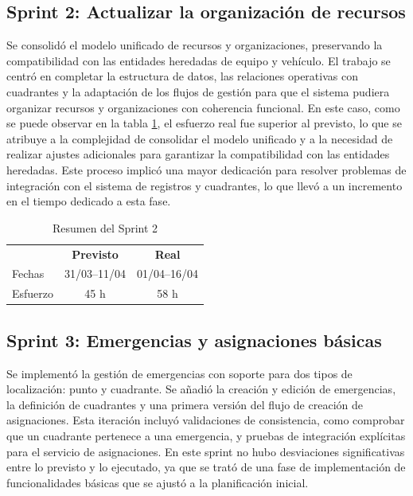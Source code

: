 \subsection{Sprint 2: Actualizar la organización de recursos}
Se consolidó el modelo unificado de recursos y organizaciones, preservando la compatibilidad con las entidades heredadas de equipo y vehículo. El trabajo se centró en completar la estructura de datos, las relaciones operativas con cuadrantes y la adaptación de los flujos de gestión para que el sistema pudiera organizar recursos y organizaciones con coherencia funcional. En este caso, como se puede observar en la tabla \ref{tab:sprint2}, el esfuerzo real fue superior al previsto, lo que se atribuye a la complejidad de consolidar el modelo unificado y a la necesidad de realizar ajustes adicionales para garantizar la compatibilidad con las entidades heredadas. Este proceso implicó una mayor dedicación para resolver problemas de integración con el sistema de registros y cuadrantes, lo que llevó a un incremento en el tiempo dedicado a esta fase.

\begin{table}[H]
  \centering
  \begin{tabular}{l|c|c}
    \rowcolor{udcpink!25}
    \textbf{} & \textbf{Previsto} & \textbf{Real} \\
    Fechas & 31/03--11/04 & 01/04--16/04 \\
    Esfuerzo & 45 h & 58 h \\
  \end{tabular}
  \caption{Resumen del Sprint 2}
  \label{tab:sprint2}
\end{table}

\subsection{Sprint 3: Emergencias y asignaciones básicas}
Se implementó la gestión de emergencias con soporte para dos tipos de localización: punto y cuadrante. Se añadió la creación y edición de emergencias, la definición de cuadrantes y una primera versión del flujo de creación de asignaciones. Esta iteración incluyó validaciones de consistencia, como comprobar que un cuadrante pertenece a una emergencia, y pruebas de integración explícitas para el servicio de asignaciones. En este sprint no hubo desviaciones significativas entre lo previsto y lo ejecutado, ya que se trató de una fase de implementación de funcionalidades básicas que se ajustó a la planificación inicial.

